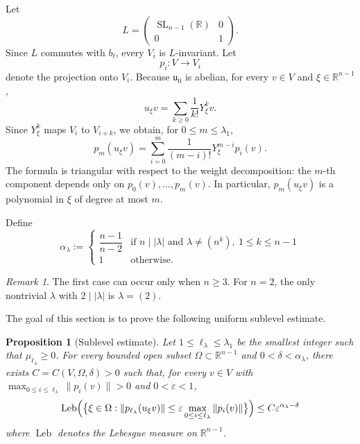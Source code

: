 \documentclass[reqno,11pt]{amsart}
\numberwithin{equation}{section}
\newtheorem{proposition}[theorem]{Proposition}
\theoremstyle{definition}
\theoremstyle{remark}
\newtheorem{remark}[theorem]{Remark}
\newcommand{\op}{\operatorname}
\newcommand{\be}{\begin{equation}}
\newcommand{\ee}{\end{equation}}
\newcommand{\R}{\mathbb R}
\newcommand{\SL}{\op{SL}}
\begin{document}
Let
$$
L=
\begin{pmatrix}
\SL_{n-1}(\R)&0\\
0&1
\end{pmatrix}.
$$
Since $L$ commutes with $b_t$, every $V_i$ is $L$-invariant. Let
$$
p_i:V\to V_i
$$
denote the projection onto $V_i$. Because $\mathfrak u_0$ is abelian, for every $v\in V$ and $\xi\in\R^{n-1}$,
$$
u_\xi v=\sum_{k\ge 0}\frac{1}{k!}Y_\xi^k v.
$$
Since $Y_\xi^k$ maps $V_i$ to $V_{i+k}$, we obtain, for
$0\le m\le \lambda_1$,
\begin{equation}\label{eq:polynomialcoordinate}
p_m(u_\xi v)
=
\sum_{i=0}^{m}\frac{1}{(m-i)!}Y_\xi^{m-i}p_i(v).
\end{equation}
The formula is triangular with respect to the weight decomposition: the
$m$-th component depends only on $p_0(v),\ldots,p_m(v)$. In particular,
$p_m(u_\xi v)$ is a polynomial in $\xi$ of degree at most $m$.

Define
\begin{equation}\label{alphalambda}
\alpha_\lambda:=
\begin{cases}
\dfrac{n-1}{n-2}
&\text{if }n\mid |\lambda| \text{ and }\lambda\neq (n^k),\ 1\le k\le n-1\\ 
1
&\text{otherwise}.
\end{cases}
\end{equation}

\begin{remark}\label{rem:sublevel-n2} The first case can occur only when $n\ge3$.
For $n=2$, the only nontrivial $\lambda$ with $2\mid |\lambda|$ is
$\lambda=(2)$.
\end{remark}


The goal of this section is to prove the following uniform sublevel estimate.

\begin{proposition}[Sublevel estimate]\label{prop:sublevelestimate}
Let $1\le \ell_\lambda\le \lambda_1$ be the
smallest integer such that $\mu_{\ell_\lambda}\ge 0$.
For every bounded open subset $\Omega\subset \R^{n-1}$ and $0<\delta<\alpha_\lambda$, there exists $C=C(V,\Omega,\delta)>0$ such that, for
every $v\in V$ with $\max_{0\le i\le \ell_{\lambda}}\|p_i(v)\|>0$ and $0<\varepsilon<1$,
\be\label{dt}
\operatorname{Leb}
\Bigl(
\bigl\{\xi\in\Omega:\|p_{\ell_{\lambda}}(u_\xi v)\|\le \varepsilon \max_{0\le i\le \ell_{\lambda}}\|p_i(v)\|\bigr\}
\Bigr)
\le
C\varepsilon^{\alpha_\lambda-\delta}
\ee
where $\operatorname{Leb}$ denotes the Lebesgue measure on $\mathbb R^{n-1}$.
\end{proposition}
\end{document}
